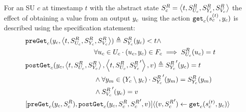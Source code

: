 \begin{definition}\label{def:getout}  
  For an SU $c$ at timestamp $t$ with the abstract state $S^{R}_{c} =  \left\langle t,S^{R}_{U_{c}}, S^{R}_{Y_{c}}, S^{R}_{V_c} \right\rangle $ the effect of obtaining a value from an output $y_{c}$ using the action $\mathtt{get}_{c}(s_{c}^{(t)},y_{c})$ is described using the specification statement:
  \begin{align}
    &\mathtt{preGet}_{c}(y_{c},  \left\langle t,S^{R}_{U_{c}}, S^{R}_{Y_{c}}, S^{R}_{V_c} \right\rangle ) \triangleq
    S^{R}_{Y_{c}}(y_{c}) < t \land \nonumber \\
    & \qquad \qquad \qquad \qquad \qquad 
    \forall u_{c} \in U_{c} \cdot (u_{c}, y_{c}) \in F_{c} 
    \implies S^{R}_{U_{c}}(u_{c}) = t  \nonumber \\
    &\mathtt{postGet}_{c}(y_{c},  \left\langle t,S^{R}_{U_{c}}, S^{R}_{Y_{c}} \right\rangle ,  \left\langle t,S^{R}_{U_{c}}, {S^{R}_{Y_{c}}}' \right\rangle , v) \triangleq 
    {S^{R}_{Y_{c}}}'(y_{c}) = t \nonumber \\
    & \qquad \qquad \qquad \qquad \qquad 
    \land 
    \forall y_{m} \in (Y_{c} \setminus y_{c}) \cdot 
    {S^{R}_{Y_{c}}}'(y_{m}) =
    S^{R}_{Y_{c}}(y_{m})\nonumber\\
    &\qquad \qquad \qquad \qquad \qquad \land
    {S^{R}_{V_c}}'(y_{c})= v \nonumber\\
    &[\mathtt{preGet}_{c}(y_{c}, S^{R}_{c}), 
    \mathtt{postGet}_{c}(y_{c}, S^{R}_{c}, {S^{R}_{c}}', v)] 
    \langle (v, {S^{R}_{c}}') \gets \mathtt{get}_{c}(s_{c}^{(t)},y_{c}) \rangle \nonumber
  \end{align}
\end{definition}

